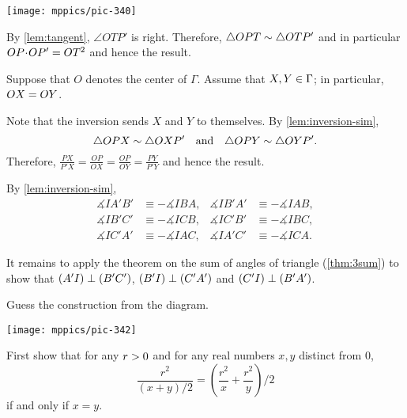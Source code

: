 \begin{multicols}{2}
\begin{Figure}
\vskip-0mm
\centering
\texttt{[image: mppics/pic-340]}
\end{Figure}

\setcounter{eqtn}{0}

By \ref{lem:tangent}, $\angle OTP'$ is right. 
Therefore, $\triangle OPT\z\sim \triangle OTP'$
and in particular
$OP\cdot OP'\z=OT^2$
and hence the result.

Suppose that $O$ denotes the center of $\Gamma$.
Assume that $X,Y\z\in \Gamma$;
in particular, $OX\z=OY$.



Note that the inversion sends $X$ and $Y$ to themselves.
By \ref{lem:inversion-sim},
$$\triangle OPX\z\sim \triangle OXP'
\quad
\text{and}
\quad
\triangle OPY\sim \triangle OYP'.$$
Therefore, 
$\frac{PX}{P'X}=\frac{OP}{OX}=\frac{OP}{OY}=\frac{PY}{P'Y}$
and hence the result.

By \ref{lem:inversion-sim},
\begin{align*}
\measuredangle IA'B'&\equiv -\measuredangle IBA,
&
\measuredangle IB'A'&\equiv -\measuredangle IAB,
\\
\measuredangle IB'C'&\equiv -\measuredangle ICB,
&
\measuredangle IC'B'&\equiv -\measuredangle IBC,
\\
\measuredangle IC'A'&\equiv -\measuredangle IAC,
&
\measuredangle IA'C'&\equiv -\measuredangle ICA.
\end{align*}

It remains to apply the theorem on the sum of angles of triangle (\ref{thm:3sum})
to show that $(A'I)\z\perp (B'C')$, 
$(B'I)\z\perp (C'A')$
and
$(C'I)\z\perp (B'A')$.

Guess the construction from the diagram.

\begin{Figure}
\vskip-0mm
\centering
\texttt{[image: mppics/pic-342]}
\end{Figure}

First show that for any $r\z>0$ and for any real numbers $x,y$ distinct from $0$,
$$\frac{r^2}{(x+y)/2}
=
\left(\frac {r^2}x+\frac {r^2}y\right)/2$$
if and only if $x=y$.


\end{multicols}
